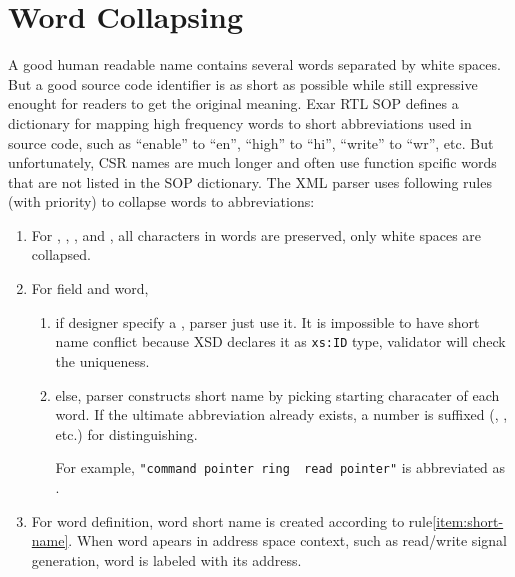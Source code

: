 \documentclass[10pt,oneside]{book}
\begin{document}
\section{Word Collapsing}
A good human readable name contains several words separated
by white spaces. But a good source code identifier is as short
as possible while still expressive enought for readers to get
the original meaning. Exar RTL SOP defines a dictionary for mapping 
high frequency words to short abbreviations  used in source code, 
such as ``enable'' to ``en'', ``high'' to ``hi'', ``write'' to ``wr'', 
etc. But unfortunately, CSR names are much longer and often
use function spcific words that are not listed in the SOP dictionary.
The XML parser uses following rules (with priority) to 
collapse words to abbreviations:
\begin{enumerate}
  \item For , , 
    , and , all characters 
    in words are preserved, only white spaces are collapsed. 
    
  \item\label{item:short-name} For \gls{field} and \gls{word}, 
    \begin{enumerate}
      \item if designer specify a , parser
        just use it. It is impossible to have short name conflict because 
        XSD declares it as \lstinline{xs:ID} type, validator will check the uniqueness. 
      \item else, parser constructs short name by picking starting characater 
        of each word. If the ultimate abbreviation already exists, a number 
        is suffixed (, , etc.) for distinguishing. 

        For example, \lstinline[showspaces=true]{"command pointer ring  read pointer"}
        is abbreviated as . 
    \end{enumerate}

  \item For \gls{word} definition, word short name is created according to 
    rule\autoref{item:short-name}. When word apears in address space context, 
    such as read/write signal generation, word is labeled with its address.
\end{enumerate}
\end{document}
